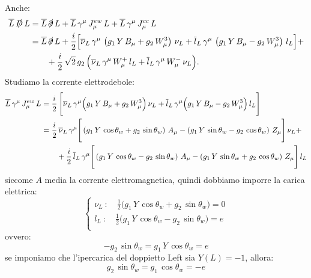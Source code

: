 Anche:
\begin{align}
    \overline{L}\, \slashed{D}\, L &= \overline{L}\, \slashed{\partial}\, L + \overline{L}\, \gamma^\mu\, J_\mu^{ew}\, L + \overline{L}\, \gamma^\mu\, J_{\mu}^{cc}\, L \\
    &= \overline{L}\, \slashed{\partial}\, L + \frac{i}{2}\Big[ \overline{\nu}_L\, \gamma^\mu\, \left( g_1\, Y\, B_\mu + g_2\, W_\mu^3 \right)\, \nu_L + \overline{l}_L\, \gamma^\mu\, \left( g_1\, Y\, B_\mu - g_2\, W_\mu^3 \right)\, l_L \Big] + \notag \\
    &\qquad + \frac{i}{2}\, \sqrt{2}\, g_2\, \Big( \overline{\nu}_L\, \gamma^\mu\, W_\mu^+\, l_L + \overline{l}_L\, \gamma^\mu\, W_\mu^-\, \nu_L \Big).
\end{align}
Studiamo la corrente elettrodebole:
\begin{align}
    \overline{L}\, \gamma^\mu\, J_\mu^{ew}\, L &= \frac{i}{2}\, \Bigg[ \overline{\nu}_L\, \gamma^\mu\Big( g_1\, Y\, B_\mu + g_2\, W_\mu^3 \Big)\, \nu_L + \overline{l}_L\, \gamma^\mu\Big( g_1\, Y\, B_\mu - g_2\, W_\mu^3 \Big)\, l_L \Bigg] \\
    &= \frac{i}{2}\, \overline{\nu}_L\, \gamma^\mu\Bigg[ \left( g_1\, Y\, \cos\theta_w + g_2\, \sin\theta_w \right)\, A_\mu - \left( g_1\, Y\, \sin\theta_w - g_2\, \cos\theta_w \right)\, Z_\mu \Bigg]\, \nu_L + \notag \\
    &\qquad + \frac{i}{2}\, \overline{l}_L\, \gamma^\mu\Bigg[ \left( g_1\, Y\, \cos\theta_w - g_2\, \sin\theta_w \right)\, A_\mu - \left( g_1\, Y\, \sin\theta_w + g_2\, \cos\theta_w \right)\, Z_\mu \Bigg]\, l_L
\end{align}
siccome $A$ media la corrente elettromagnetica, quindi dobbiamo imporre la carica elettrica:
\begin{equation}
    \begin{cases}
        \nu_L\ :\quad \frac{1}{2}\Big( g_1\, Y\, \cos\theta_w + g_2\, \sin\theta_w \Big) = 0 \\
        l_L\ :\quad \frac{1}{2}\Big( g_1\, Y\, \cos\theta_w - g_2\, \sin\theta_w \Big) = e \\
    \end{cases}
\end{equation}
ovvero:
\begin{equation}
    -g_2\, \sin\theta_w = g_1\, Y\, \cos\theta_w = e
\end{equation}
se imponiamo che l'ipercarica del doppietto Left sia $Y(L)=-1$, allora:
\begin{equation}
    g_2\, \sin\theta_w = g_1\, \cos\theta_w = - e
\end{equation}
